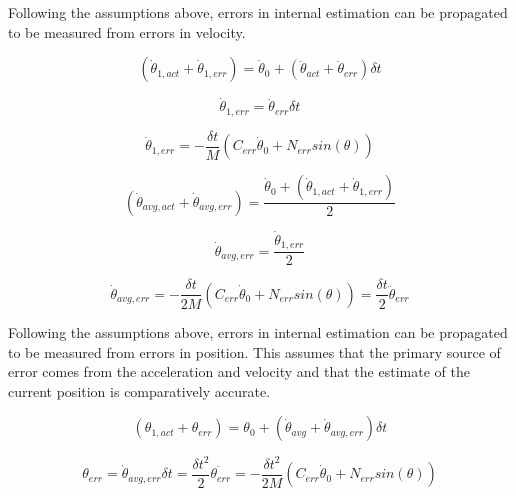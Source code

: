 
Following the assumptions above, errors in internal estimation can be propagated to be measured from errors in velocity.

\begin{equation}
(\dot{\theta}_{1, act} + \dot{\theta}_{1, err}) = \dot{\theta}_{0} + (\ddot{\theta}_{act} + \ddot{\theta}_{err}) \delta t
\end{equation}

\begin{equation}
\dot{\theta}_{1, err} = \ddot{\theta}_{err} \delta t
\end{equation}

\begin{equation}
\dot{\theta}_{1, err} = - \dfrac{\delta t}{M}(C_{err} \dot{\theta}_{0} + N_{err} sin(\theta))
\end{equation}

\begin{equation}
(\dot{\theta}_{avg, act} + \dot{\theta}_{avg, err}) = \dfrac{\dot{\theta}_{0} + (\dot{\theta}_{1, act} + \dot{\theta}_{1, err})}{2}
\end{equation}

\begin{equation}
\dot{\theta}_{avg, err} = \dfrac{\dot{\theta}_{1, err}}{2}
\end{equation}

\begin{equation}
\dot{\theta}_{avg, err} = - \dfrac{\delta t}{2M}(C_{err} \dot{\theta}_{0} + N_{err} sin(\theta)) = \dfrac{\delta t}{2} \ddot{\theta}_{err}
\end{equation}


Following the assumptions above, errors in internal estimation can be propagated to be measured from errors in position. This assumes that the primary source of error comes from the acceleration and velocity and that the estimate of the current position is comparatively accurate.

\begin{equation}
(\theta_{1, act} + \theta_{err}) = \theta_{0} + (\dot{\theta}_{avg} + \dot{\theta}_{avg, err}) \delta t
\end{equation}

\begin{equation}
\theta_{err} = \dot{\theta}_{avg, err} \delta t = \dfrac{\delta t^{2}}{2} \ddot{\theta_{err}} = - \dfrac{\delta t^{2}}{2M}(C_{err} \dot{\theta}_{0} + N_{err} sin(\theta))
\end{equation}

